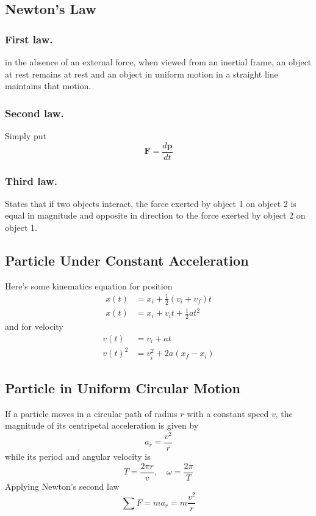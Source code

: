 \documentclass[../../../main.tex]{subfiles}
\begin{document}
\subsection*{Newton's Law}
\subsubsection*{First law.} in the absence of an external force, when viewed from an inertial frame, an object at rest remains at rest and an object in uniform motion in a straight line maintains that motion.

\subsubsection*{Second law.} Simply put 
\begin{equation*}
    \mathbf{F}=\frac{d\mathbf{p}}{dt}
\end{equation*}

\subsubsection*{Third law.} States that if two objects interact, the force exerted by object 1 on object 2 is equal in magnitude and opposite in direction to the force exerted by object 2 on object 1.

\subsection*{Particle Under Constant Acceleration}
Here's some kinematics equation for position
\begin{align*}
    x(t)&=x_i+\frac{1}{2}(v_i+v_f)t\\
    x(t)&=x_i+v_it+\frac{1}{2}at^2
\end{align*}
and for velocity
\begin{align*}
    v(t)&=v_i+at\\
    v(t)^2&=v_i^2+2a(x_f-x_i)
\end{align*}

\subsection*{Particle in Uniform Circular Motion}
If a particle moves in a circular path of radius $r$ with a constant speed $v$, the magnitude of its centripetal acceleration is given by
\begin{equation*}
    a_r=\frac{v^2}{r}
\end{equation*}
while its period and angular velocity is 
\begin{equation*}
    T=\frac{2\pi r}{v},\quad \omega=\frac{2\pi}{T}
\end{equation*}
Applying Newton's second law 
\begin{equation*}
    \sum F=ma_r=m\frac{v^2}{r}
\end{equation*}
\end{document}
